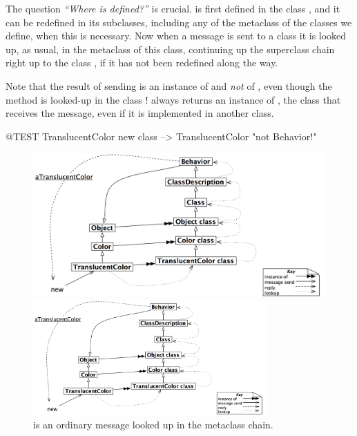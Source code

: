 \documentclass[a4paper,10pt,twoside]{book}
\begin{document}
The question \emph{``Where  is defined?''} is crucial.  is first defined in the class , and it can be redefined in its subclasses, including any of the metaclass of the classes we define, when this is necessary. Now when a message  is sent to a class it is looked up, as usual, in the metaclass of this class, continuing up the superclass chain right up to the class , if it has not been redefined along the way.

Note that the result of sending  is an instance of  and \emph{not} of , even though the method is looked-up in the class !   always returns an instance of \self, the class that receives the message, even if it is implemented in another class.

\begin{code}{@TEST}
TranslucentColor new class --> TranslucentColor    "not Behavior!"
\end{code}

\begin{center}
\begin{figure}
\ifluluelse
	{\centerline{\includegraphics[width=\textwidth]{TranslucentSendingNew}}}
	{\centerline{\includegraphics[width=0.8\textwidth]{TranslucentSendingNew}}}
\caption{ is an ordinary message looked up in the metaclass chain.\label{fig:sendingnew}}
\end{figure}
\end{center}
\end{document}
